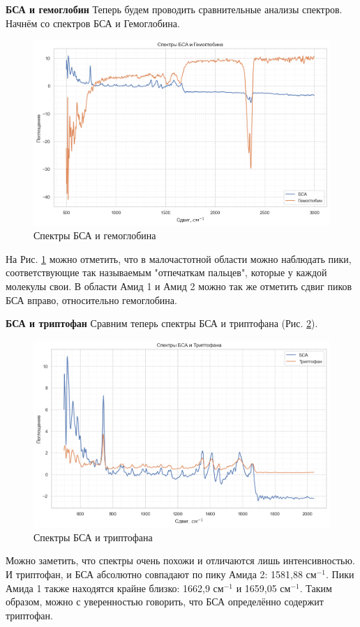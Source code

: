 \documentclass{article}
\begin{document}
\textbf{БСА и гемоглобин}
Теперь будем проводить сравнительные анализы спектров. Начнём со спектров БСА и Гемоглобина. 

\begin{figure}[h!]
\centering
    \includegraphics[width=0.8\linewidth]{Images/БСА+Гем.png}
    \caption{Спектры БСА и гемоглобина}
    \label{БСА и Гем}
\end{figure}

На Рис. \ref{БСА и Гем} можно отметить, что в малочастотной области можно наблюдать пики, соответствующие так называемым "отпечаткам пальцев", которые у каждой молекулы свои. В области Амид 1 и Амид 2 можно так же отметить сдвиг пиков БСА вправо, относительно гемоглобина.


\textbf{БСА и триптофан}
Сравним теперь спектры БСА и триптофана (Рис. \ref{БСА и Триптофан}).

\begin{figure}[h!]
\centering
    \includegraphics[width=0.8\linewidth]{Images/Триптофан и БСА.png}
    \caption{Спектры БСА и триптофана}
    \label{БСА и Триптофан}
\end{figure}

Можно заметить, что спектры очень похожи и отличаются лишь интенсивностью. И триптофан, и БСА абсолютно совпадают по пику Амида 2: 1581,88 см$^{-1}$. Пики Амида 1 также находятся крайне близко: 1662,9 см$^{-1}$ и 1659,05 см$^{-1}$. Таким образом, можно с уверенностью говорить, что БСА определённо содержит триптофан.  
\end{document}
